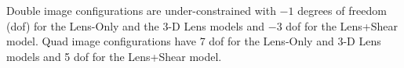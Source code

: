 Double image configurations are under-constrained with $-1$ degrees of freedom (dof) for the Lens-Only and the 3-D Lens models and $-3$ dof for the Lens+Shear model. Quad image configurations have 7 dof for the Lens-Only and 3-D Lens models and 5 dof for the Lens+Shear model.